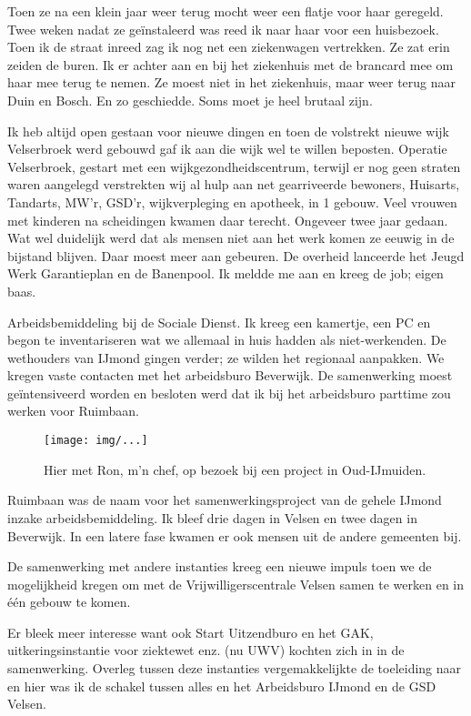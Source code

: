 \documentclass[10pt,twoside,openright]{memoir}
\begin{document}
Toen ze na een klein jaar weer terug mocht weer een flatje voor haar geregeld. Twee weken nadat ze geïnstaleerd was reed ik naar haar voor een huisbezoek. Toen ik de straat inreed zag ik nog net een ziekenwagen vertrekken. Ze zat erin zeiden de buren. Ik er achter aan en bij het ziekenhuis met de brancard mee om haar mee terug te nemen. Ze moest niet in het ziekenhuis, maar weer terug naar Duin en Bosch. En zo geschiedde. Soms moet je heel brutaal zijn.

Ik heb altijd open gestaan voor nieuwe dingen en toen de volstrekt nieuwe wijk Velserbroek werd gebouwd gaf ik aan die wijk wel te willen beposten. Operatie Velserbroek, gestart met een wijkgezondheidscentrum, terwijl er nog geen straten waren aangelegd verstrekten wij al hulp aan net gearriveerde bewoners, Huisarts, Tandarts, MW’r, GSD’r, wijkverpleging en apotheek, in 1 gebouw. Veel vrouwen met kinderen na scheidingen kwamen daar terecht. Ongeveer twee jaar gedaan. Wat wel duidelijk werd dat als mensen niet aan het werk komen ze eeuwig in de bijstand blijven. Daar moest meer aan gebeuren. De overheid lanceerde het Jeugd Werk Garantieplan en de Banenpool. Ik meldde me aan en kreeg de job; eigen baas. 

Arbeidsbemiddeling bij de Sociale Dienst. Ik kreeg een kamertje, een PC en begon te inventariseren wat we allemaal in huis hadden als niet-werkenden. De wethouders van IJmond gingen verder; ze wilden het regionaal aanpakken. We kregen vaste contacten met het arbeidsburo Beverwijk. 
De samenwerking moest geïntensiveerd worden en besloten werd dat ik bij het arbeidsburo parttime zou werken voor Ruimbaan.

\begin{figure}[t]
\texttt{[image: img/...]}
\caption{Hier met Ron, m’n chef, op bezoek bij een project in Oud-IJmuiden.}
\end{figure}

Ruimbaan was de naam voor het samenwerkingsproject van de gehele IJmond inzake arbeidsbemiddeling. Ik bleef drie dagen in Velsen en twee dagen in Beverwijk. In een latere fase kwamen er ook mensen uit de andere gemeenten bij. 

De samenwerking met andere instanties kreeg een nieuwe impuls toen we de mogelijkheid kregen om met de Vrijwilligerscentrale Velsen samen te werken en in één gebouw te komen. 

Er bleek meer interesse want ook Start Uitzendburo en het GAK, uitkeringsinstantie voor ziektewet enz. (nu UWV) kochten zich in in de samenwerking. Overleg tussen deze instanties vergemakkelijkte de toeleiding naar en hier was ik de schakel tussen alles en het Arbeidsburo IJmond en de GSD Velsen. 
\end{document}

